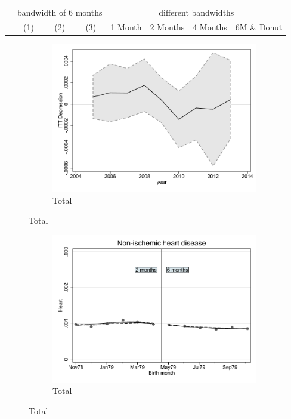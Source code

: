 \documentclass[a4paper ]{article}
\begin{document}
\begin{table}[h]\centering
\def\sym#1{\ifmmode^{#1}\else\(^{#1}\)\fi}
\begin{tabular}{l*{3}{c}|cccc}
\toprule
&\multicolumn{3}{c}{bandwidth of 6 months} & \multicolumn{4}{c}{different bandwidths} \\
 \cmidrule(lr{1em}){2-4} \cmidrule(lr{1em}){5-8}
 &\multicolumn{1}{c}{(1)}&\multicolumn{1}{c}{(2)}&\multicolumn{1}{c}{(3)}& 1 Month & 2 Months & 4 Months & 6M \& Donut \\
\midrule 

\bottomrule
\end{tabular}
\end{table}

\begin{figure}[h!]
	\centering
	\begin{subfigure}[t]{0.5\textwidth}
		\centering
		\includegraphics[width=0.99\textwidth]{R1_LC_Depression}
		\caption{Total}		
	\end{subfigure}
\end{figure}
\newpage
\begin{figure}[h]
	\centering
	\begin{subfigure}[t]{0.5\textwidth}
		\centering
		\includegraphics[width=0.99\textwidth]{R1_RD_Heart_fits}
		\caption{Total}		
	\end{subfigure}
\end{figure}
\end{document}
